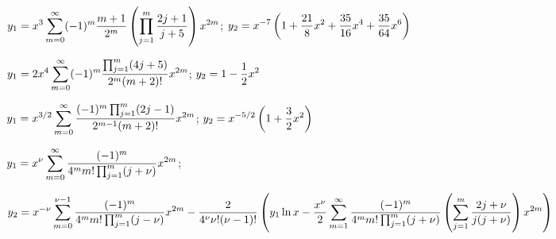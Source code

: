 $y_{1}=\displaystyle{x^{3}\sum_{m=0}^{\infty}(-1)^{m}\frac{m+1}{2^{m}}\left(\prod_{j=1}^{m}\frac{2j+1}{j+5}\right)x^{2m}}$;\;
$y_{2}=\displaystyle{x^{-7}\left(1+\frac{21}{8}x^{2}+\frac{35}{16}x^{4}+\frac{35}{64}x^{6}\right)}$

$y_{1}=\displaystyle{2x^{4}\sum_{m=0}^{\infty}(-1)^{m}\frac{\prod_{j=1}^{m}(4j+5)}{2^{m}(m+2)!}x^{2m}}$;\;
$y_{2}=\displaystyle{1-\frac{1}{2}x^{2}}$

$y_{1}=\displaystyle{x^{3/2}\sum_{m=0}^{\infty}\frac{(-1)^{m}
\prod_{j=1}^{m}(2j-1)}{2^{m-1}(m+2)!}x^{2m}}$;\;
$y_{2}=\displaystyle{x^{-5/2}\left(1+\frac{3}{2}x^{2}\right)}$

$\displaystyle{y_{1}=x^{\nu}\sum_{m=0}^{\infty}\frac{(-1)^{m}}{4^{m}m!
\prod_{j=1}^{m}(j+\nu)}x^{2m}}$;\;

\quad\;  \;
$\displaystyle{y_{2}=x^{-\nu}\sum_{m=0}^{\nu-1}\frac{(-1)^{m}}{4^{m}m!\prod_{j=1}^{m}(j-\nu)}x^{2m}
-\frac{2}{4^{\nu}\nu!(\nu-1)!}\left(y_{1}\ln x-\frac{x^{\nu}}{2}
\sum_{m=1}^{\infty}\frac{(-1)^{m}}{4^{m}m!\prod_{j=1}^{m}(j+\nu)}
\left(\sum_{j=1}^{m}\frac{2j+\nu}{j(j+\nu)}\right)x^{2m}\right)}$

\bigskip

